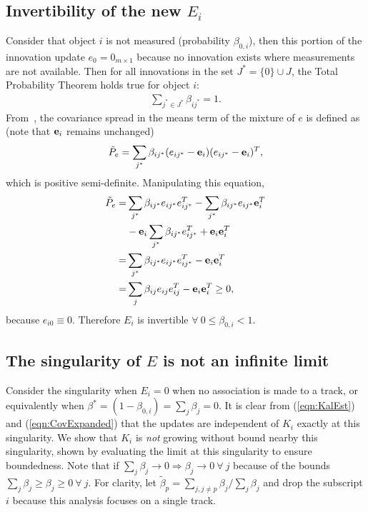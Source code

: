 \documentclass[letterpaper, 10pt, conference]{ieeeconf}
\newcommand{\refeqn}[1]{(\ref{eqn:#1})}
\begin{document}
\begin{appendix}
\label{append}

\subsection{Invertibility of the new $E_i$} \label{NewPartOfEIsPSD}
Consider that object $i$ is not measured (probability $\beta_{0,i}$), then this portion of the innovation update $e_0=0_{m\times1}$ because no innovation exists where measurements are not available.
Then for all innovations in the set $J^*=\{0\}\cup J$, the Total Probability Theorem holds true for object $i$:
\begin{align}
\sum\limits_{j^*\in J^*}\beta_{ij^*}=1.
\end{align}
From~\cite[Eq. 1.4.16-(1-10)]{ShaRonThi2001}, the covariance spread in the means term of the mixture of $e$ is defined as (note that ${\bf e}_{i}$ remains unchanged)
\begin{align}
\tilde P_e=\sum\limits_{j^*}\beta_{ij^*}(e_{ij^*}-{\bf e}_{i})(e_{ij^*}-{\bf e}_{i})^T,
\end{align}
which is positive semi-definite. Manipulating this equation,
\begin{align}
\tilde P_e=&\sum\limits_{j^*}\beta_{ij^*}e_{ij^*}e_{ij^*}^T
-\sum\limits_{j^*}\beta_{ij^*}e_{ij^*}{\bf e}_{i}^T\nonumber
\\
&
-{\bf e}_{i}\sum\limits_{j^*}\beta_{ij^*}e_{ij^*}^T
+{\bf e}_{i}{\bf e}_{i}^T\nonumber
\\
=&\sum\limits_{j^*}\beta_{ij^*}e_{ij^*}e_{ij^*}^T-{\bf e}_{i}{\bf e}_{i}^T\nonumber
\\
=&\sum\limits_{j}\beta_{ij}e_{ij}e_{ij}^T-{\bf e}_{i}{\bf e}_{i}^T\geq0,
\label{eqn:CovSpreadPSD}
\end{align}
because $e_{i0}\equiv0$. Therefore $E_i$ is invertible $\forall\ 0\leq\beta_{0,i}<1$.


\subsection{The singularity of $E$ is not an infinite limit}
Consider the singularity when $E_i=0$ when no association is made to a track, or equivalently when $\beta^*=(1-\beta_{0,i})=\sum\limits_{j}\beta_j=0$.
It is clear from \refeqn{KalEst} and \refeqn{CovExpanded} that the updates are independent of $K_i$ exactly at this singularity.
We show that $K_i$ is \emph{not} growing without bound nearby this singularity, shown by evaluating the limit at this singularity to ensure boundedness.
Note that if $\sum\limits_{j}\beta_j\rightarrow0\Rightarrow \beta_j\rightarrow0\ \forall\ j$ because of the bounds $\sum\limits_{j}\beta_j\geq\beta_j\geq0\ \forall \ j$.
For clarity, let $\tilde\beta_p=\sum\limits_{j,j\neq p}\beta_j/\sum\limits_{j}\beta_j$ and drop the subscript $i$ because this analysis focuses on a single track.


\end{appendix}
\end{document}
